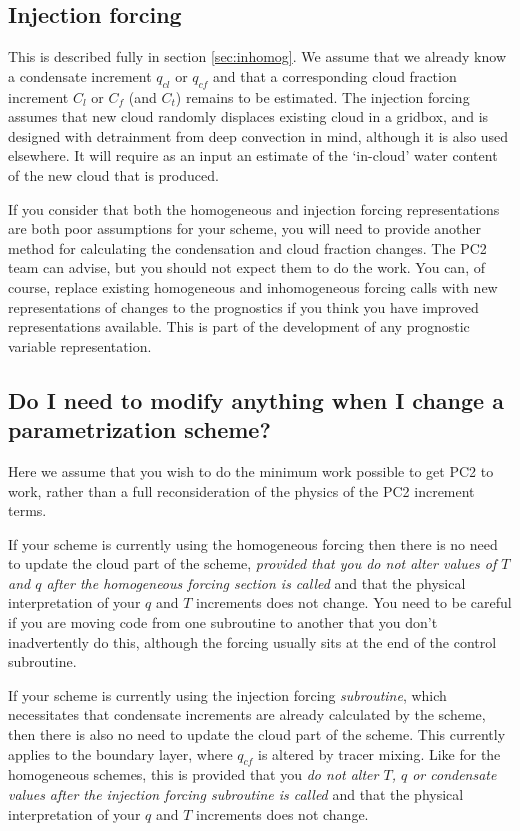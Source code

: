 \documentclass{UMDP_article}
\begin{document}
\subsection{Injection forcing}
This is described fully in section \ref{sec:inhomog}. We assume that
we already know a condensate increment $q_{cl}$ or $q_{cf}$ and that a
corresponding cloud fraction increment $C_l$ or $C_f$ (and $C_t$) remains
to be estimated. The injection forcing assumes that new cloud randomly
displaces existing cloud in a gridbox, and is designed with detrainment
from deep convection in mind, although it is also used elsewhere. It will
require as an input an estimate of the `in-cloud' water content of
the new cloud that is produced.

If you consider that both the homogeneous and injection forcing representations
are both poor assumptions for your scheme, you will need to provide
another method for calculating the condensation and cloud fraction changes.
The PC2 team can advise, but you should not expect them to do the work.
You can, of course, replace existing homogeneous and inhomogeneous forcing
calls with new representations of changes to the prognostics if you think
you have improved representations available. This is part of the
development of any prognostic variable representation.

\subsection{Do I need to modify anything when I change a parametrization scheme?}

Here we assume that you wish to do the minimum work possible to get
PC2 to work, rather than a full reconsideration of the physics of the PC2
increment terms.

If your scheme is currently using the homogeneous forcing
then there is no need to update the cloud part of the scheme,
\textit{provided that
you do not alter values of $T$ and $q$ after the homogeneous forcing
section is called} and that the physical interpretation of your $q$ and $T$
increments does not change. You need to be careful if you are moving code from
one subroutine to another that you don't inadvertently do this, although
the forcing usually sits at the end of the control subroutine.

If your scheme is currently using the injection forcing \textit{subroutine},
which necessitates that condensate
increments are already calculated by the scheme, then there is also no need
to update the cloud part of the scheme. This currently applies to the boundary
layer, where $q_{cf}$ is altered by tracer mixing. Like for the
homogeneous schemes, this
is provided that you \textit{do not alter $T$, $q$ or condensate values after
the injection forcing subroutine is called} and that the physical
interpretation of your $q$ and $T$ increments does not change. 
\end{document}
